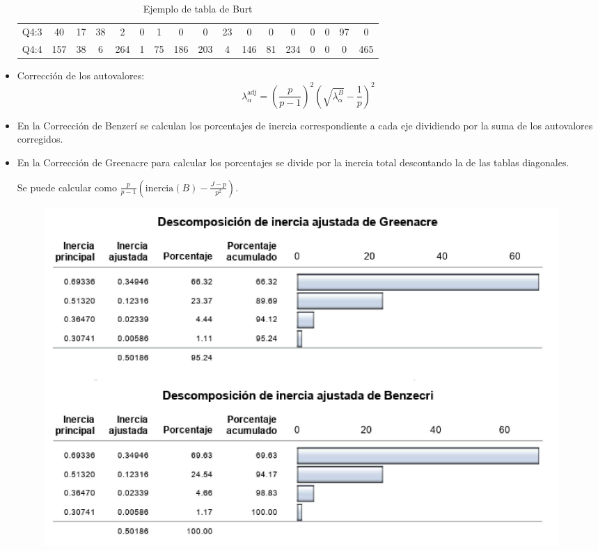 \begin{itemize}
\begin{table}[h!]
{\begin{tabular}[width=\textwidth]{c|cccc|cccc|cccc|cccc|}
            Q4:3 & 40   & 17   & 38   & 2    & 0    & 1    & 0    & 0    & 23   & 0    & 0    & 0    & 0    & 0    & 97   & 0    \\
            Q4:4 & 157  & 38   & 6    & 264  & 1    & 75   & 186  & 203  & 4    & 146  & 81   & 234  & 0    & 0    & 0    & 465  \\
            \hline
        \end{tabular}
        }
        \caption{Ejemplo de tabla de Burt}
    \end{table}
    \item Corrección de los autovalores:
    \[
        \lambda^{\text{adj}}_\alpha=\left(\frac{p}{p-1}\right)^2\left(\sqrt{\lambda^B_\alpha}-\frac{1}{p}\right)^2
    \]
    \item En la Corrección de Benzerí se calculan los porcentajes de inercia correspondiente a cada eje dividiendo por la suma de los autovalores corregidos.
    \item En la Corrección de Greenacre para calcular los porcentajes se divide por la inercia total descontando la de las tablas diagonales. 
    
    Se puede calcular como $\frac{p}{p-1}\left(\text{inercia}(B)-\frac{J-p}{p^2}\right)$.
    \begin{figure}[ht]
        \centering
        \includegraphics[width=\textwidth]{assets/correcciones_inercia.png}
    \end{figure}
\end{itemize}
